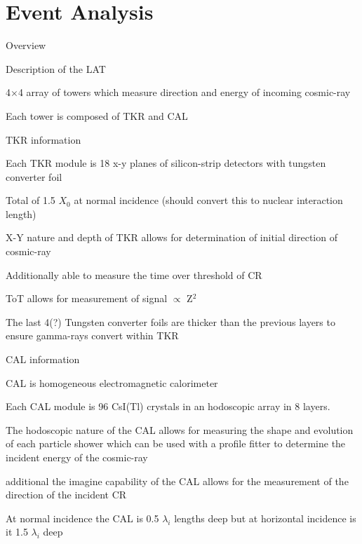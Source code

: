 \documentclass{article}
\begin{document}
\section{Event Analysis}
	\begin{myEnumerate}
		\item Overview
			\begin{myEnumerate}
				\item Description of the LAT
				\item 4$\times$4 array of towers which measure direction and energy of incoming cosmic-ray
				\item Each tower is composed of TKR and CAL
				\item TKR information
				\begin{myEnumerate}
					\item Each TKR module is 18 x-y planes of silicon-strip detectors with tungsten converter foil
					\item Total of 1.5 $X_0$ at normal incidence (should convert this to nuclear interaction length)
					\item X-Y nature and depth of TKR allows for determination of initial direction of cosmic-ray
					\item Additionally able to measure the time over threshold of CR
					\item ToT allows for measurement of signal $\propto$ Z$^2$
					\item The last 4(?) Tungsten converter foils are thicker than the previous layers to ensure gamma-rays convert within TKR
				\end{myEnumerate}
				\item CAL information
				\begin{myEnumerate}
					\item CAL is homogeneous electromagnetic calorimeter
					\item Each CAL module is 96 CsI(Tl) crystals in an hodoscopic array in 8 layers.
					\item The hodoscopic nature of the CAL allows for measuring the shape and evolution of each particle shower which can be used with a profile fitter to determine the incident energy of the cosmic-ray
					\item additional the imagine capability of the CAL allows for the measurement of the direction of the incident CR
					\item At normal incidence the CAL is 0.5 $\lambda_i$ lengths deep but at horizontal incidence is it 1.5 $\lambda_i$ deep
				\end{myEnumerate}

\end{myEnumerate}
\end{myEnumerate}
\end{document}
